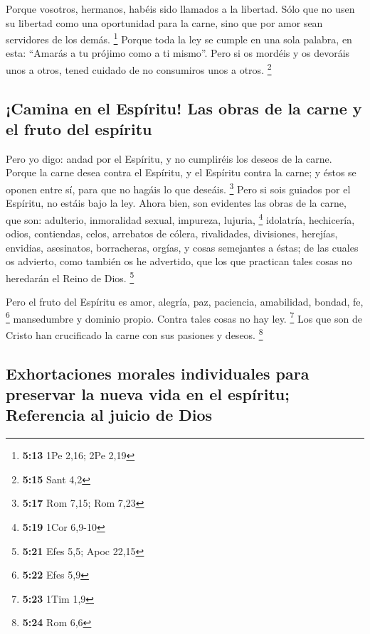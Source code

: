 \begin{paracol}{2}
 Porque vosotros, hermanos, habéis sido llamados a la
libertad. Sólo que no usen su libertad como una oportunidad para la
carne, sino que por amor sean servidores de los demás. \footnote{\textbf{5:13}
  1Pe 2,16; 2Pe 2,19}  Porque toda la ley se cumple en
una sola palabra, en esta: ``Amarás a tu prójimo como a ti mismo''.
 Pero si os mordéis y os devoráis unos a otros, tened
cuidado de no consumiros unos a otros. \footnote{\textbf{5:15} Sant 4,2}

\hypertarget{camina-en-el-espuxedritu-las-obras-de-la-carne-y-el-fruto-del-espuxedritu}{%
\subsection{¡Camina en el Espíritu! Las obras de la carne y el fruto del
espíritu}\label{camina-en-el-espuxedritu-las-obras-de-la-carne-y-el-fruto-del-espuxedritu}}

 Pero yo digo: andad por el Espíritu, y no cumpliréis los
deseos de la carne.  Porque la carne desea contra el
Espíritu, y el Espíritu contra la carne; y éstos se oponen entre sí,
para que no hagáis lo que deseáis. \footnote{\textbf{5:17} Rom 7,15; Rom
  7,23}  Pero si sois guiados por el Espíritu, no estáis
bajo la ley.  Ahora bien, son evidentes las obras de la
carne, que son: adulterio, inmoralidad sexual, impureza, lujuria,
\footnote{\textbf{5:19} 1Cor 6,9-10}  idolatría,
hechicería, odios, contiendas, celos, arrebatos de cólera, rivalidades,
divisiones, herejías,  envidias, asesinatos, borracheras,
orgías, y cosas semejantes a éstas; de las cuales os advierto, como
también os he advertido, que los que practican tales cosas no heredarán
el Reino de Dios. \footnote{\textbf{5:21} Efes 5,5; Apoc 22,15}

 Pero el fruto del Espíritu es amor, alegría, paz,
paciencia, amabilidad, bondad, fe, \footnote{\textbf{5:22} Efes 5,9}
 mansedumbre y dominio propio. Contra tales cosas no hay
ley. \footnote{\textbf{5:23} 1Tim 1,9}  Los que son de
Cristo han crucificado la carne con sus pasiones y deseos. \footnote{\textbf{5:24}
  Rom 6,6}

\hypertarget{exhortaciones-morales-individuales-para-preservar-la-nueva-vida-en-el-espuxedritu-referencia-al-juicio-de-dios}{%
\subsection{Exhortaciones morales individuales para preservar la nueva
vida en el espíritu; Referencia al juicio de
Dios}\label{exhortaciones-morales-individuales-para-preservar-la-nueva-vida-en-el-espuxedritu-referencia-al-juicio-de-dios}}


\end{paracol}
